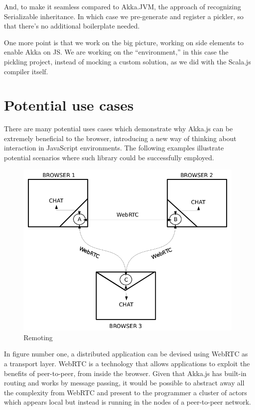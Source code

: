 \documentclass{sig-alternate}
\begin{document}
And, to make it seamless compared to Akka.JVM, the approach of recognizing
Serializable inheritance. In which case we pre-generate and register a
pickler, so that there's no additional boilerplate needed.

One more point is that we work on the big picture, working on side elements to
enable Akka on JS. We are working on the ``environment,'' in this case the
pickling project, instead of mocking a custom solution, as we did with the
Scala.js compiler itself.


\section{Potential use cases}\label{sec:usecases}

There are many potential uses cases which demonstrate why Akka.js can be extremely beneficial to the browser, introducing a new way of thinking about interaction in JavaScript environments. The following examples illustrate
potential scenarios where such library could be successfully employed.

\begin{figure}
\centering
\includegraphics[scale=0.2]{1.png}
\caption{Remoting}
\label{fig:remoting}
\end{figure}

In figure number one, a distributed application can be devised using WebRTC as a transport layer.
WebRTC is a technology that allows applications to exploit the benefits of peer-to-peer, from inside
the browser. Given that Akka.js has built-in routing and works by message passing, it would be
possible to abstract away all the complexity from WebRTC and present to the programmer a cluster of
actors which appears local but instead is running in the nodes of a peer-to-peer network.
\end{document}
